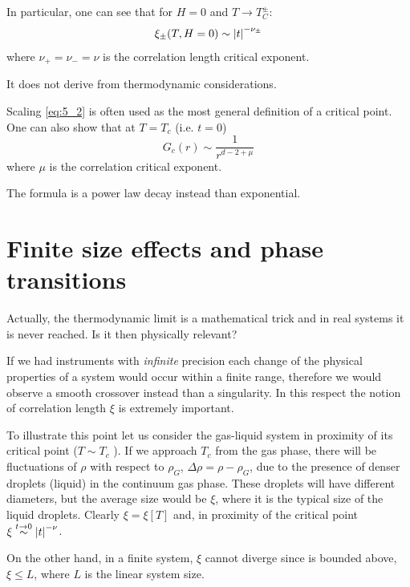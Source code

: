 \documentclass[../main/main.tex]{subfiles}
\begin{document}
In particular, one can see that for \( H=0 \) and \( T \rightarrow T_C^\pm \):
\begin{equation}
  \xi _\pm (T,H=0) \sim \abs{t}^{- \nu _\pm}
  \label{eq:5_2}
\end{equation}
where \( \nu _+ = \nu _- = \nu  \) is the correlation length critical exponent.
\begin{remark}
It does not derive from thermodynamic considerations.
\end{remark}
Scaling \eqref{eq:5_2} is often used as the most general definition of a critical point. One can also show that at \( T=T_c \) (i.e. \( t=0 \))
\begin{equation}
  G_c (r) \sim \frac{1}{r^{d-2+\mu }}
\end{equation}
where \( \mu  \) is the correlation critical exponent.
\begin{remark}
The formula is a power law decay instead than exponential.
\end{remark}

\section{Finite size effects and phase transitions}
Actually, the thermodynamic limit is a mathematical trick and in real systems it is never reached. Is it then physically relevant?

If we had instruments with \emph{infinite} precision each change of the physical properties of a system would occur within a finite range, therefore we would observe a smooth crossover instead than a singularity. In this respect the notion of correlation length \( \xi  \) is extremely important.

To illustrate this point let us consider the gas-liquid system in proximity of its critical point (\( T \sim T_c \) ). If we approach \( T_c \) from the gas phase, there will be fluctuations of \( \rho  \) with respect to \( \rho _G \), \( \Delta \rho = \rho - \rho _G \), due to the presence of denser droplets (liquid) in the continuum gas phase.
These droplets will have different diameters, but the average size would be \( \xi  \), where it is the typical size of the liquid droplets.
Clearly \( \xi = \xi [T] \) and, in proximity of the critical point \( \xi  \overset{t \rightarrow 0}{\sim } \abs{t}^{-\nu }   \).

On the other hand, in a finite system, \( \xi  \) cannot diverge since is bounded above, \( \xi \le L \), where \( L \) is the linear system size.
\end{document}
